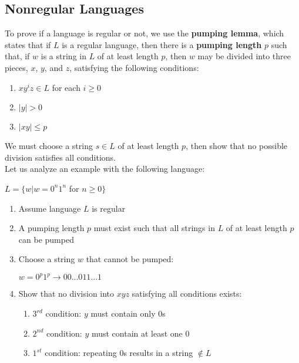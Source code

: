 \documentclass{article}
\begin{document}
\subsection{Nonregular Languages}
To prove if a language is regular or not, we use the \textbf{pumping lemma}, which states that if $L$ is a regular language, then there is a \textbf{pumping length} $p$ such that, if $w$ is a string in $L$ of at least length $p$, then $w$ may be divided into three pieces, $x$, $y$, and $z$, satisfying the following conditions:
\begin{enumerate}
    \item $xy^iz \in L$ for each $i \geq 0$
    \item $|y| > 0$
    \item $|xy| \leq p$ 
\end{enumerate}
We must choose a string $s \in L$ of at least length $p$, then show that no possible division satisfies all conditions. \\
Let us analyze an example with the following language:
\begin{center}
    $L = \{w|w = 0^n1^n$ for $n \geq0\}$
\end{center}
\newpage
\begin{enumerate}
    \item Assume language $L$ is regular
    \item A pumping length $p$ must exist such that all strings in $L$ of at least length $p$ can be pumped
    \item Choose a string $w$ that cannot be pumped:
        \begin{center}
            $w=0^p1^p \rightarrow 00...0 11...1$
        \end{center}
    \item Show that no division into $xyz$ satisfying all conditions exists:
        \begin{enumerate}
            \item $3^{rd}$ condition: $y$ must contain only $0$s
            \item $2^{nd}$ condition: $y$ must contain at least one $0$
            \item $1^{st}$ condition: repeating $0$s results in a string $\notin L$
        \end{enumerate}
\end{enumerate}
\end{document}
